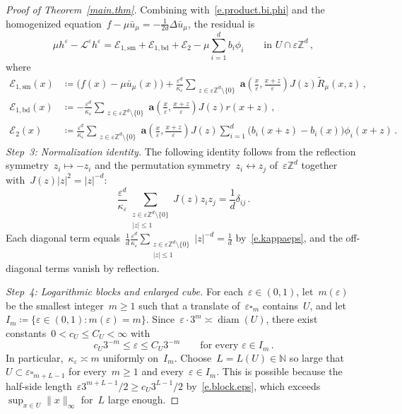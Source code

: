 \documentclass[11pt]{amsart}
\theoremstyle{plain}
\theoremstyle{definition}
\theoremstyle{remark}
\newcommand{\Zd}{\mathbb{Z}^d}
\renewcommand{\a}{\mathbf{a}}
\newcommand{\cu}{\square}
\newcommand{\eps}{\varepsilon}
\begin{document}
\begin{proof}[Proof of Theorem~\ref{main.thm}]
		Combining with~\eqref{e.product.bi.phi} and the homogenized equation~$f - \mu\bar u_\mu = -\frac{1}{2d}\Delta\bar u_\mu$, the residual is
		\begin{equation}
			\label{e.residual.decomp}
			\mu h^\eps - \mathcal{L}^\eps h^\eps = \mathcal{E}_{1,\mathrm{sm}} + \mathcal{E}_{1,\mathrm{bd}} + \mathcal{E}_2 - \mu\sum_{i=1}^{d} b_i \phi_i \qquad \text{in } U \cap \eps\Zd\,,
		\end{equation}
		where
		\begin{align}
			\mathcal{E}_{1,\mathrm{sm}}(x) &\coloneqq \bigl(f(x) - \mu\bar u_\mu(x)\bigr) + \frac{\eps^d}{\kappa_\eps}\sum_{\substack{z \in \eps\Zd \setminus \{0\}}} \a\left(\frac{x}{\eps},\frac{x{+}z}{\eps}\right) J(z) \widetilde R_\mu(x,z)\,, \label{e.E1sm.def} \\
			\mathcal{E}_{1,\mathrm{bd}}(x) &\coloneqq -\frac{\eps^d}{\kappa_\eps}\sum_{\substack{z \in \eps\Zd \setminus \{0\}}} \a\left(\frac{x}{\eps},\frac{x{+}z}{\eps}\right) J(z) r(x{+}z)\,, \label{e.E1bd.def} \\
			\mathcal{E}_2(x) &\coloneqq \frac{\eps^d}{\kappa_\eps}\sum_{\substack{z \in \eps\Zd \setminus \{0\}}} \a\left(\frac{x}{\eps},\frac{x{+}z}{\eps}\right) J(z) \sum_{i=1}^d \bigl(b_i(x{+}z) - b_i(x)\bigr)\phi_i(x{+}z)\,. \label{e.E2.def}
		\end{align}
		\emph{Step~3: Normalization identity.}
		The following identity follows from the reflection symmetry~$z_i \mapsto -z_i$ and the permutation symmetry~$z_i \leftrightarrow z_j$ of~$\eps\Zd$ together with~$J(z)|z|^2 = |z|^{-d}$:
		\begin{equation}
			\label{e.second.moment.normalised}
			\frac{\eps^d}{\kappa_\eps}
			\sum_{\substack{z \in \eps\Zd \setminus\{0\} \\ |z|\le 1}}
			J(z) z_i z_j
			=
			\frac{1}{d} \delta_{ij}\,.
		\end{equation}
		Each diagonal term equals~$\frac{1}{d}\frac{\eps^d}{\kappa_\eps}\sum_{\substack{z \in \eps\Zd \setminus \{0\} \\ |z|\le 1}} |z|^{-d} = \frac{1}{d}$ by~\eqref{e.kappaeps}, and the off-diagonal terms vanish by reflection.
		
		\emph{Step~4: Logarithmic blocks and enlarged cube.}
		For each~$\eps \in (0,1)$, let~$m(\eps)$ be the smallest integer~$m \ge 1$ such that a translate of~$\eps\cu_m$ contains~$U$, and let~$I_m \coloneqq \{\eps \in (0,1) : m(\eps) = m\}$.
		Since~$\eps \cdot 3^m \asymp \operatorname{diam}(U)$, there exist constants~$0 < c_U \le C_U < \infty$ with
		\begin{equation}
			\label{e.block.eps}
			c_U 3^{-m} \le \eps \le C_U 3^{-m}
			\qquad \text{for every } \eps \in I_m\,.
		\end{equation}
		In particular,~$\kappa_\eps \asymp m$ uniformly on~$I_m$.
		Choose~$L = L(U) \in \mathbb{N}$ so large that~$U \subset \eps\cu_{m+L-1}$ for every~$m \ge 1$ and every~$\eps \in I_m$.
		This is possible because the half-side length~$\eps 3^{m+L-1}/2 \ge c_U 3^{L-1}/2$ by~\eqref{e.block.eps}, which exceeds~$\sup_{x \in U} \|x\|_\infty$ for~$L$ large enough.
		

\end{proof}
\end{document}
